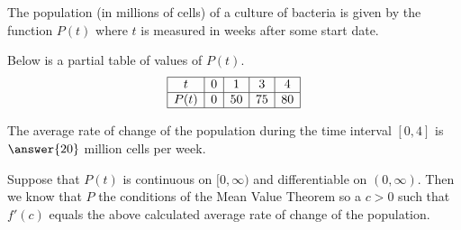 \documentclass{ximera}
\author{Nela Lakos \and Kyle Parsons}
\begin{document}
\begin{exercise}

The population (in millions of cells) of a culture of bacteria is given by the function $P(t)$ where $t$ is measured in weeks after some start date.

Below is a partial table of values of $P(t)$.
\[
\begin{array}{|c|c|c|c|c|}
\hline
t & 0 & 1 & 3 & 4\\\hline
P(t) & 0 & 50 & 75 & 80\\\hline
\end{array} 
\]

The average rate of change of the population during the time interval $[0,4]$ is $\answer{20}$ million cells per week.

Suppose that $P(t)$ is continuous on $[0,\infty)$ and differentiable on $(0,\infty)$. Then we know that $P$  the conditions of the Mean Value Theorem so  a $c>0$ such that $f'(c)$ equals the above calculated average rate of change of the population.

\end{exercise}
\end{document}
